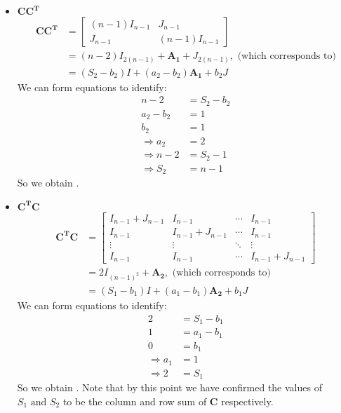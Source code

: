 \documentclass{article}
\begin{document}
\begin{itemize}
    \item \(\mathbf{CC^T}\)
    \begin{align*}
        \mathbf{CC^T} &=
        \begin{bmatrix}
            (n-1)I_{n-1} & J_{n-1} \\
            J_{n-1} & (n-1)I_{n-1}
        \end{bmatrix}\\
        &= (n-2)I_{2(n-1)} + \mathbf{A_1} + J_{2(n-1)}, \text{ (which corresponds to)}\\
        &= (S_2-b_2)I + (a_2-b_2)\mathbf{A_1} + b_2J
    \end{align*}
    We can form equations to identify:
    \begin{align*}
        n -2 &= S_2 - b_2 \\
        a_2 - b_2 &= 1 \\
        b_2 &= 1 \\
        \Rightarrow a_2 &= 2 \\
        \Rightarrow n-2 &= S_2 - 1 \\
        \Rightarrow S_2 &= n-1
    \end{align*}
    So we obtain .

    \item \(\mathbf{C^T C}\)
    \begin{align*}
        \mathbf{C^T C} &=
        \begin{bmatrix}
            I_{n-1} + J_{n-1} & I_{n-1} & \cdots & I_{n-1} \\
            I_{n-1} & I_{n-1} + J_{n-1} & \cdots & I_{n-1} \\
            \vdots & \vdots & \ddots & \vdots \\
            I_{n-1} & I_{n-1} & \cdots & I_{n-1} + J_{n-1}
        \end{bmatrix} \\
        &=
        2I_{(n-1)^2} + \mathbf{A_2}, \text{ (which corresponds to)}\\
        &= (S_1-b_1)I + (a_1-b_1)\mathbf{A_2} + b_1J
    \end{align*}
    We can form equations to identify:
    \begin{align*}
        2 &= S_1 - b_1 \\
        1 &= a_1 - b_1 \\
        0 &= b_1 \\
        \Rightarrow a_1 &= 1 \\
        \Rightarrow 2 &= S_1 
    \end{align*}
    So we obtain .
    Note that by this point we have confirmed the values of $S_1 \text{ and }S_2$ to be the column and row sum of $\mathbf{C}$ respectively.


\end{itemize}
\end{document}
